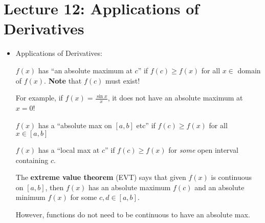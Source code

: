 \section{Lecture 12: Applications of Derivatives}
\begin{itemize}
    \item Applications of Derivatives:
    \begin{definition}
        $f(x)$ has ``an absolute maximum at $c$'' if $f(c) \ge f(x)$ for all $x\in$ domain of $f(x)$. \textbf{Note} that $f(c)$ must exist!
        \vspace{2mm}

        For example, if $f(x) = \frac{\sin x}{x}$, it does not have an absolute maximum at $x=0$!

        \begin{center}
        \end{center}
    \end{definition}
    \begin{definition}
        $f(x)$ has a ``absolute max on $[a,b]$ etc'' if $f(c) \ge f(x)$ for all $x\in[a,b]$
    \end{definition}
    \begin{definition}
        $f(x)$ has a ``local max at $c$'' if $f(c) \ge f(x)$ for \textit{some} open interval containing $c$.
    \end{definition}
    \begin{theorem}
        The \textbf{extreme value theorem} (EVT) says that given $f(x)$ is continuous on $[a,b]$, then $f(x)$ has an absolute maximum $f(c)$ and an absolute minimum $f(x)$ for some $c,d \in [a,b]$.
        \vspace{2mm}

        However, functions do not need to be continuous to have an absolute max.


\end{theorem}
\end{itemize}
